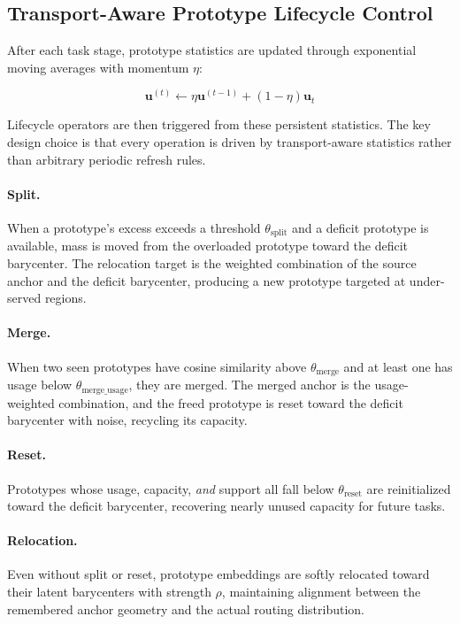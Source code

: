 \documentclass[11pt,a4paper]{article}
\theoremstyle{definition}
\begin{document}
\subsection{Transport-Aware Prototype Lifecycle Control}
\label{sec:lifecycle}

After each task stage, prototype statistics are updated through exponential moving averages with momentum $\eta$:

\begin{equation}
\mathbf{u}^{(t)} \leftarrow \eta \mathbf{u}^{(t-1)} + (1-\eta) \mathbf{u}_t
\end{equation}

Lifecycle operators are then triggered from these persistent statistics. The key design choice is that every operation is driven by transport-aware statistics rather than arbitrary periodic refresh rules.

\paragraph{Split.} When a prototype's excess exceeds a threshold $\theta_{\text{split}}$ and a deficit prototype is available, mass is moved from the overloaded prototype toward the deficit barycenter. The relocation target is the weighted combination of the source anchor and the deficit barycenter, producing a new prototype targeted at under-served regions.

\paragraph{Merge.} When two seen prototypes have cosine similarity above $\theta_{\text{merge}}$ and at least one has usage below $\theta_{\text{merge\_usage}}$, they are merged. The merged anchor is the usage-weighted combination, and the freed prototype is reset toward the deficit barycenter with noise, recycling its capacity.

\paragraph{Reset.} Prototypes whose usage, capacity, \textit{and} support all fall below $\theta_{\text{reset}}$ are reinitialized toward the deficit barycenter, recovering nearly unused capacity for future tasks.

\paragraph{Relocation.} Even without split or reset, prototype embeddings are softly relocated toward their latent barycenters with strength $\rho$, maintaining alignment between the remembered anchor geometry and the actual routing distribution.
\end{document}
